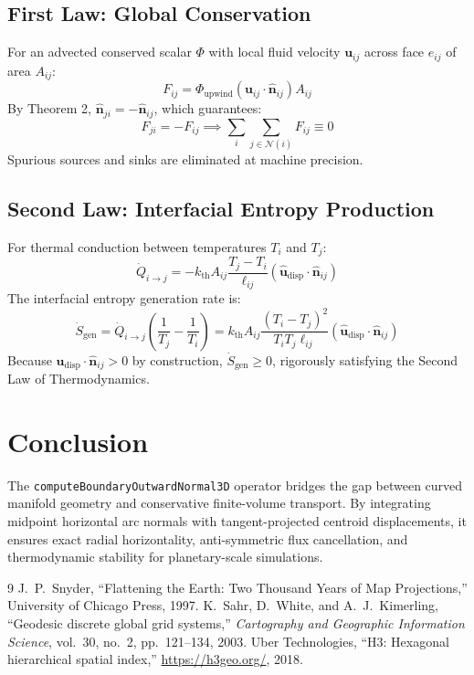 \documentclass[11pt,a4paper]{article}
\theoremstyle{definition}
\begin{document}
\subsection{First Law: Global Conservation}
For an advected conserved scalar $\Phi$ with local fluid velocity $\mathbf{u}_{ij}$ across face $e_{ij}$ of area $A_{ij}$:
\begin{equation}
    F_{ij} = \Phi_{\text{upwind}} (\mathbf{u}_{ij} \cdot \hat{\mathbf{n}}_{ij}) A_{ij}
\end{equation}
By Theorem 2, $\hat{\mathbf{n}}_{ji} = -\hat{\mathbf{n}}_{ij}$, which guarantees:
\begin{equation}
    F_{ji} = -F_{ij} \implies \sum_{i} \sum_{j \in \mathcal{N}(i)} F_{ij} \equiv 0
\end{equation}
Spurious sources and sinks are eliminated at machine precision.

\subsection{Second Law: Interfacial Entropy Production}
For thermal conduction between temperatures $T_i$ and $T_j$:
\begin{equation}
    \dot{Q}_{i \to j} = -k_{\text{th}} A_{ij} \frac{T_j - T_i}{\ell_{ij}} (\hat{\mathbf{u}}_{\text{disp}} \cdot \hat{\mathbf{n}}_{ij})
\end{equation}
The interfacial entropy generation rate is:
\begin{equation}
    \dot{S}_{\text{gen}} = \dot{Q}_{i \to j} \left(\frac{1}{T_j} - \frac{1}{T_i}\right) = k_{\text{th}} A_{ij} \frac{(T_i - T_j)^2}{T_i T_j \ell_{ij}} (\hat{\mathbf{u}}_{\text{disp}} \cdot \hat{\mathbf{n}}_{ij})
\end{equation}
Because $\hat{\mathbf{u}}_{\text{disp}} \cdot \hat{\mathbf{n}}_{ij} > 0$ by construction, $\dot{S}_{\text{gen}} \ge 0$, rigorously satisfying the Second Law of Thermodynamics.

\section{Conclusion}
The \texttt{computeBoundaryOutwardNormal3D} operator bridges the gap between curved manifold geometry and conservative finite-volume transport. By integrating midpoint horizontal arc normals with tangent-projected centroid displacements, it ensures exact radial horizontality, anti-symmetric flux cancellation, and thermodynamic stability for planetary-scale simulations.

\begin{thebibliography}{9}
J.~P.~Snyder, ``Flattening the Earth: Two Thousand Years of Map Projections,'' University of Chicago Press, 1997.
K.~Sahr, D.~White, and A.~J.~Kimerling, ``Geodesic discrete global grid systems,'' \textit{Cartography and Geographic Information Science}, vol.~30, no.~2, pp.~121--134, 2003.
Uber Technologies, ``H3: Hexagonal hierarchical spatial index,'' \url{https://h3geo.org/}, 2018.
\end{thebibliography}
\end{document}
